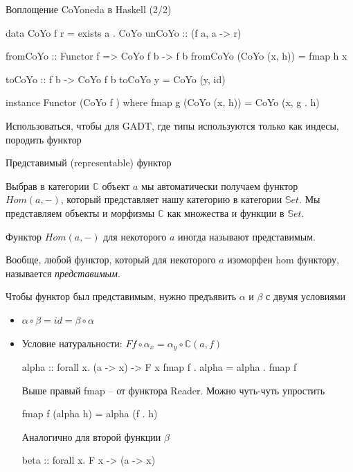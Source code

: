 \documentclass[
  russian,
  aspectratio=169,
  xcolor={svgnames},
  hyperref={colorlinks,citecolor=DeepPink4,linkcolor=DarkRed,urlcolor=DarkBlue}]{beamer}
\begin{document}
\begin{frame}[fragile]{Воплощение CoYoneda в Haskell (2/2)}
\begin{hslisting}
data CoYo f r = exists a . CoYo { unCoYo :: (f a, a -> r) }
\end{hslisting}

\begin{hslisting}
fromCoYo :: Functor f => CoYo f b -> f b 
fromCoYo (CoYo (x, h)) = fmap h x

toCoYo :: f b -> CoYo f b
toCoYo y = CoYo (y, id)

instance Functor (CoYo f ) where
  fmap g (CoYo (x, h)) = CoYo (x, g . h)
\end{hslisting}
Использоваться, чтобы для GADT, где типы используются только как индесы, породить функтор
\end{frame}


\begin{frame}[fragile]{Представимый (representable) функтор}

Выбрав в категории $\mathbb{C}$ объект $a$ мы автоматически получаем функтор $Hom(a,-)$, который представляет нашу категорию в категории $\mathbb{S}et$. Мы представляем объекты и морфизмы $\mathbb{C}$ как множества и функции в $\mathbb{S}et$.\vspace{0.5cm}

Функтор $Hom(a,-)$ для некоторого $a$ иногда называют представимым.\vspace{0.5cm}

Вообще, любой функтор, который для некоторого $a$ изоморфен 
hom функтору, называется \emph{представимым}.\vspace{0.5cm}
\end{frame}

\begin{frame}[fragile]
Чтобы функтор был представимым, нужно предъявить $\alpha$ и $\beta$ с двумя условиями

\begin{itemize}
 \item $\alpha\circ\beta = \mathit{id} = \beta\circ\alpha$
 \item Условие натуральности: 
     $Ff \circ \alpha_x = \alpha_y \circ \mathbb{C}(a, f)$
 \begin{hslisting}
  alpha :: forall x. (a -> x) -> F x
  fmap f . alpha = alpha . fmap f
 \end{hslisting}
 Выше правый fmap -- от функтора Reader. Можно чуть-чуть упростить
 \begin{hslisting}
  fmap f (alpha h) = alpha (f . h)
 \end{hslisting}\vspace{0.5cm}
Аналогично для второй функции $\beta$
 \begin{hslisting}
  beta :: forall x. F x -> (a -> x)
 \end{hslisting}
\end{itemize}
\end{frame}
\end{document}
